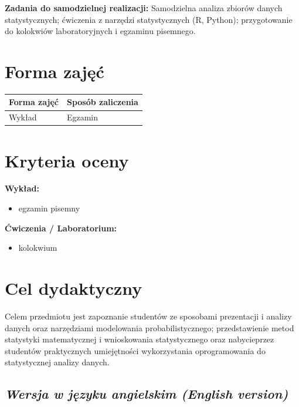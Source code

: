 \documentclass[12pt, a4paper]{article}
\newcommand{\thdrule}{\noalign{\global\setlength{\extrarowheight}{0pt}}}
\newcommand{\thdend}{\noalign{\global\setlength{\extrarowheight}{3pt}}}
\begin{document}
\vspace{4pt}
\noindent\textbf{Zadania do samodzielnej realizacji:} Samodzielna analiza zbiorów danych statystycznych; ćwiczenia z narzędzi statystycznych (R, Python); przygotowanie do kolokwiów laboratoryjnych i egzaminu pisemnego.

\section{Forma zajęć}

\begin{center}
{\scriptsize
\begin{tabular}{m{5cm}m{8cm}}
\thdrule\toprule
\rowcolor{pjatkRed} {\color{white}\textbf{Forma zajęć}} & {\color{white}\textbf{Sposób zaliczenia}} \\
\midrule\thdend
  \rowcolor{tableRowLight} Wykład & Egzamin \\
\bottomrule
\end{tabular}}
\end{center}

\section{Kryteria oceny}

\textbf{Wykład:}
\begin{itemize}
  \item egzamin pisemny
\end{itemize}
\vspace{4pt}
\textbf{Ćwiczenia / Laboratorium:}
\begin{itemize}
  \item kolokwium
\end{itemize}


\section{Cel dydaktyczny}

Celem przedmiotu jest zapoznanie studentów ze sposobami prezentacji i analizy danych oraz narzędziami modelowania probabilistycznego; przedstawienie metod statystyki matematycznej i wnioskowania statystycznego oraz nabycieprzez studentów praktycznych umiejętności wykorzystania oprogramowania do statystycznej analizy danych.

\subsection*{\textit{Wersja w języku angielskim (English version)}}
\end{document}
